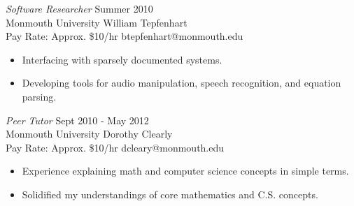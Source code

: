 \documentclass[margin]{res}
\begin{document}
\begin{resume}
	{\sl Software Researcher} \hfill Summer 2010 \\
	Monmouth University \hfill William Tepfenhart\\
	Pay Rate: Approx. \$10/hr \hfill btepfenhart@monmouth.edu
	\begin{itemize}  \itemsep -2pt
		\item Interfacing with sparsely documented systems.
		\item Developing tools for audio manipulation, speech recognition, and equation parsing. 
	\end{itemize}

	{\sl Peer Tutor} \hfill Sept 2010 - May 2012 \\
	Monmouth University \hfill Dorothy Clearly\\
	Pay Rate: Approx. \$10/hr \hfill dcleary@monmouth.edu
	\begin{itemize}  \itemsep -2pt
		\item Experience explaining math and computer science concepts in simple terms.
		\item Solidified my understandings of core mathematics and C.S. concepts.
	\end{itemize}

\end{resume}
\end{document}
